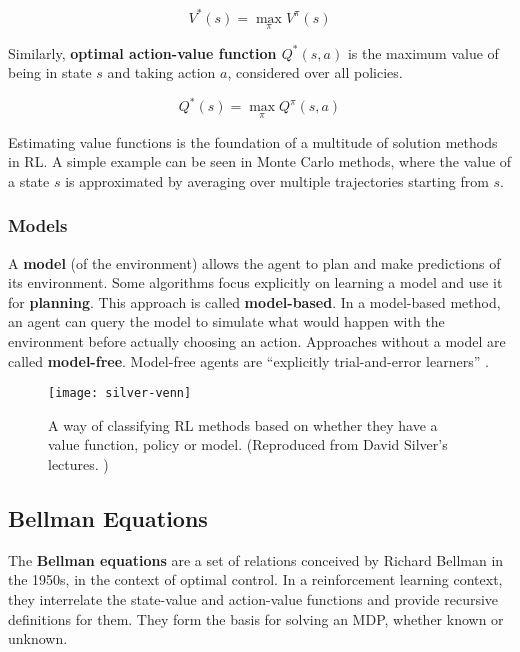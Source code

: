 \begin{equation} \label{eqn:opt-value-fun}
    V^*(s) = \max_{\pi}{V^{\pi}(s)}
\end{equation}

Similarly, \textbf{optimal action-value function $Q^*(s, a)$} is the maximum value of being in state $s$ and taking action $a$, considered over all policies.

\begin{equation} \label{eqn:opt-Q-fun}
    Q^*(s) = \max_{\pi}{Q^{\pi}(s, a)}
\end{equation}

Estimating value functions is the foundation of a multitude of solution methods in RL.
A simple example can be seen in Monte Carlo methods, where the value of a state $s$ is approximated by averaging over multiple trajectories starting from $s$.

\subsubsection{Models} \label{rl:model}
A \textbf{model} (of the environment) allows the agent to plan and make predictions of its environment.
Some algorithms focus explicitly on learning a model and use it for \textbf{planning}.
This approach is called \textbf{model-based}.
In a model-based method, an agent can query the model to simulate what would happen with the environment before actually choosing an action.
Approaches without a model are called \textbf{model-free}. Model-free agents are ``explicitly trial-and-error learners'' \cite{rlai}.

\begin{figure}[ht]
    \caption{A way of classifying RL methods based on whether they have a value function, policy or model. (Reproduced from David Silver's lectures. \cite{silver-lectures})}
    \vspace*{0.2cm}
    \centering
    \texttt{[image: silver-venn]}
\end{figure}

\subsection{Bellman Equations} \label{rl:bellman}
The \textbf{Bellman equations} are a set of relations conceived by Richard Bellman in the 1950s, in the context of optimal control.
In a reinforcement learning context, they interrelate the state-value and action-value functions and provide recursive definitions for them.
They form the basis for solving an MDP, whether known or unknown.

